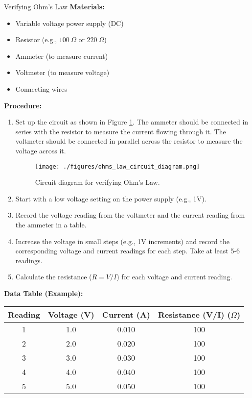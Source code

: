 \begin{investigation}{Verifying Ohm's Law}
\textbf{Materials:}
\begin{itemize}
    \item Variable voltage power supply (DC)
    \item Resistor (e.g., $100\ \Omega$ or $220\ \Omega$)
    \item Ammeter (to measure current)
    \item Voltmeter (to measure voltage)
    \item Connecting wires
\end{itemize}

\textbf{Procedure:}
\begin{enumerate}
    \item Set up the circuit as shown in Figure \ref{fig:ohms_law_circuit}. The ammeter should be connected in series with the resistor to measure the current flowing through it. The voltmeter should be connected in parallel across the resistor to measure the voltage across it.
    \begin{figure}[h]
        \centering
        \texttt{[image: ./figures/ohms\_law\_circuit\_diagram.png]}
        \caption{Circuit diagram for verifying Ohm's Law.}
        \label{fig:ohms_law_circuit}
    \end{figure}
    \item Start with a low voltage setting on the power supply (e.g., 1V).
    \item Record the voltage reading from the voltmeter and the current reading from the ammeter in a table.
    \item Increase the voltage in small steps (e.g., 1V increments) and record the corresponding voltage and current readings for each step.  Take at least 5-6 readings.
    \item Calculate the resistance ($R = V/I$) for each voltage and current reading.
\end{enumerate}

\textbf{Data Table (Example):}
\begin{center}
\begin{tabular}{|c|c|c|c|}
\hline
Reading & Voltage (V) & Current (A) & Resistance (V/I) ($\Omega$) \\
\hline
1 & 1.0 & 0.010 & 100 \\
2 & 2.0 & 0.020 & 100 \\
3 & 3.0 & 0.030 & 100 \\
4 & 4.0 & 0.040 & 100 \\
5 & 5.0 & 0.050 & 100 \\
\hline
\end{tabular}
\end{center}


\end{investigation}
